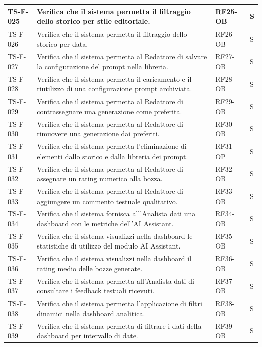 \documentclass[a4paper,12pt]{article}
\begin{document}
\begin{longtable}{|p{2.2cm}|p{9.5cm}|p{2.3cm}|p{1.5cm}|}
    \hline
    TS-F-025 & Verifica che il sistema permetta il filtraggio dello storico per stile editoriale. & RF25-OB & S \\
    \hline
    TS-F-026 & Verifica che il sistema permetta il filtraggio dello storico per data. & RF26-OB & S \\
    \hline
    TS-F-027 & Verifica che il sistema permetta al Redattore di salvare la configurazione del prompt nella libreria. & RF27-OB & S \\
    \hline
    TS-F-028 & Verifica che il sistema permetta il caricamento e il riutilizzo di una configurazione prompt archiviata. & RF28-OB & S \\
    \hline
    TS-F-029 & Verifica che il sistema permetta al Redattore di contrassegnare una generazione come preferita. & RF29-OB & S \\
    \hline
    TS-F-030 & Verifica che il sistema permetta al Redattore di rimuovere una generazione dai preferiti. & RF30-OB & S \\
    \hline
    TS-F-031 & Verifica che il sistema permetta l'eliminazione di elementi dallo storico e dalla libreria dei prompt. & RF31-OP & S \\
    \hline
    TS-F-032 & Verifica che il sistema permetta al Redattore di assegnare un rating numerico alla bozza. & RF32-OB & S \\
    \hline
    TS-F-033 & Verifica che il sistema permetta al Redattore di aggiungere un commento testuale qualitativo. & RF33-OB & S \\
    \hline
    TS-F-034 & Verifica che il sistema fornisca all'Analista dati una dashboard con le metriche dell'AI Assistant. & RF34-OB & S \\
    \hline
    TS-F-035 & Verifica che il sistema visualizzi nella dashboard le statistiche di utilizzo del modulo AI Assistant. & RF35-OB & S \\
    \hline
    TS-F-036 & Verifica che il sistema visualizzi nella dashboard il rating medio delle bozze generate. & RF36-OB & S \\
    \hline
    TS-F-037 & Verifica che il sistema permetta all'Analista dati di consultare i feedback testuali ricevuti. & RF37-OB & S \\
    \hline
    TS-F-038 & Verifica che il sistema permetta l'applicazione di filtri dinamici nella dashboard analitica. & RF38-OB & S \\
    \hline
    TS-F-039 & Verifica che il sistema permetta di filtrare i dati della dashboard per intervallo di date. & RF39-OB & S \\

\end{longtable}
\end{document}
